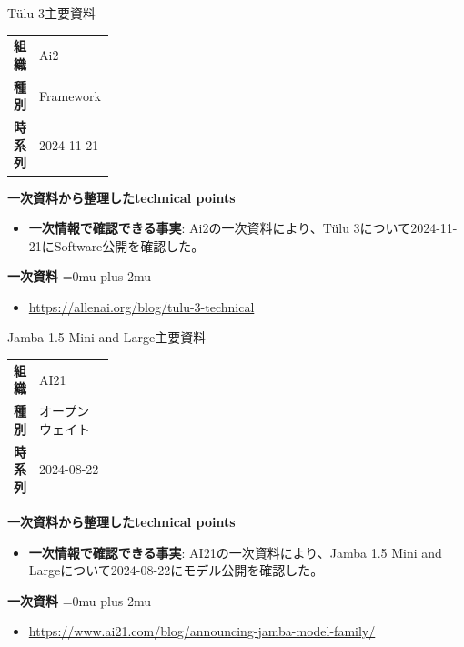 \begin{technicalnote}{Tülu 3}{主要資料}
\begingroup
\begin{tabularx}{\linewidth}{@{}>{\bfseries}p{0.22\linewidth}X@{}}
組織 & Ai2 \\
種別 & Framework \\
時系列 & 2024-11-21 \\
\end{tabularx}
\smallskip
{\bfseries 一次資料から整理したtechnical points}
\begin{itemize}[leftmargin=1.5em,itemsep=0.35em]
\item \textbf{一次情報で確認できる事実}: Ai2の一次資料により、Tülu 3について2024-11-21にSoftware公開を確認した。
\end{itemize}
\begin{minipage}{\linewidth}
\begin{samepage}
{\bfseries 一次資料}
\begingroup\sloppy
\Urlmuskip=0mu plus 2mu\relax
\begin{itemize}[leftmargin=1.5em,itemsep=0.25em]
\item {\scriptsize\url{https://allenai.org/blog/tulu-3-technical}}
\end{itemize}
\endgroup
\end{samepage}
\end{minipage}
\endgroup
\end{technicalnote}
\medskip

\begin{technicalnote}{Jamba 1.5 Mini and Large}{主要資料}
\begingroup
\begin{tabularx}{\linewidth}{@{}>{\bfseries}p{0.22\linewidth}X@{}}
組織 & AI21 \\
種別 & オープンウェイト \\
時系列 & 2024-08-22 \\
\end{tabularx}
\smallskip
{\bfseries 一次資料から整理したtechnical points}
\begin{itemize}[leftmargin=1.5em,itemsep=0.35em]
\item \textbf{一次情報で確認できる事実}: AI21の一次資料により、Jamba 1.5 Mini and Largeについて2024-08-22にモデル公開を確認した。
\end{itemize}
\begin{minipage}{\linewidth}
\begin{samepage}
{\bfseries 一次資料}
\begingroup\sloppy
\Urlmuskip=0mu plus 2mu\relax
\begin{itemize}[leftmargin=1.5em,itemsep=0.25em]
\item {\scriptsize\url{https://www.ai21.com/blog/announcing-jamba-model-family/}}
\end{itemize}
\endgroup
\end{samepage}
\end{minipage}
\endgroup
\end{technicalnote}
\medskip

